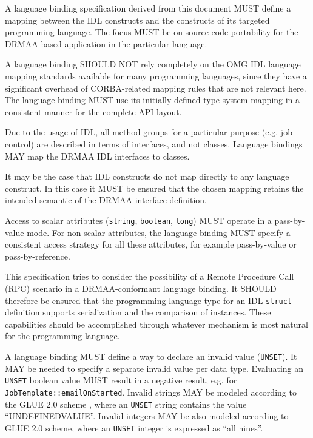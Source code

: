 \documentclass{article}
\newcommand{\h}[1]{\lstinline|#1|}
\newcommand{\langbind}[1]{\begin{shaded}#1\end{shaded}}
\newcommand{\rat}[1]{}
\begin{document}
\langbind{
A language binding specification derived from this document MUST define a mapping between the IDL constructs and the constructs of its targeted programming language. The focus MUST be on source code portability for the DRMAA-based application in the particular language. 

A language binding SHOULD NOT rely completely on the OMG IDL language mapping standards available for many programming languages, since they have a significant overhead of CORBA-related mapping rules that are not relevant here. The language binding MUST use its initially defined type system mapping in a consistent manner for the complete API layout. 

Due to the usage of IDL, all method groups for a particular purpose (e.g. job control) are described in terms of interfaces, and not classes. Language bindings MAY map the DRMAA IDL interfaces to classes.

It may be the case that IDL constructs do not map directly to any language construct. In this case it MUST be ensured that the chosen mapping retains the intended semantic of the DRMAA interface definition.

Access to scalar attributes (\h{string}, \h{boolean}, \h{long}) MUST operate in a pass-by-value mode. For non-scalar attributes, the language binding MUST specify a consistent access strategy for all these attributes, for example pass-by-value or pass-by-reference.

This specification tries to consider the possibility of a Remote Procedure Call (RPC) scenario in a DRMAA-conformant language binding. It SHOULD therefore be ensured that the programming language type for an IDL \h{struct} definition supports serialization and the comparison of instances. These capabilities should be accomplished through whatever mechanism is most natural for the programming language.

A language binding MUST define a way to declare an invalid value (\h{UNSET}). It MAY be needed to specify a separate invalid value per data type. Evaluating an \h{UNSET} boolean value MUST result in a negative result, e.g. for \h{JobTemplate::emailOnStarted}. Invalid strings MAY be modeled according to the GLUE 2.0 scheme \cite{gfd.147}, where an \h{UNSET} string contains the value \enquote{UNDEFINEDVALUE}.  Invalid integers MAY be also modeled according to GLUE 2.0 scheme, where an \h{UNSET} integer is expressed as \enquote{all nines}.
}

\rat{
The concept of a UNSET value was decided on a conf call (Aug 25th 2010). Boolean in C can use custom enumeration (TRUE, FALSE, INVALID) or pointer to static values. A numerical UNSET in C should use a magic number, since all long attributes are unsigned, it could be MIN\_INT. With Python, just use \h{None}. For Java, Dan has an idea.
}
\end{document}
